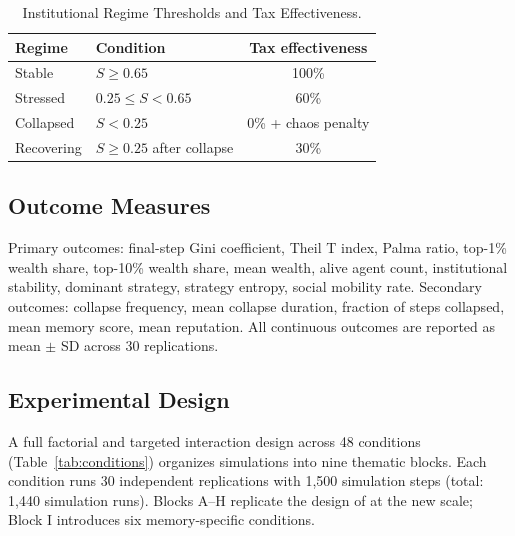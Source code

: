 \documentclass[12pt, letterpaper]{article}
\begin{document}
\begin{table}[h]
\centering
\caption{Institutional Regime Thresholds and Tax Effectiveness.}
\label{tab:regimes}
\begin{tabular}{llc}
\toprule
Regime & Condition & Tax effectiveness \\
\midrule
Stable      & $S \geq 0.65$                   & 100\% \\
Stressed    & $0.25 \leq S < 0.65$            & 60\% \\
Collapsed   & $S < 0.25$                      & 0\% + chaos penalty \\
Recovering  & $S \geq 0.25$ after collapse    & 30\% \\
\bottomrule
\end{tabular}
\end{table}

\subsection{Outcome Measures}

Primary outcomes: final-step Gini coefficient, Theil T index, Palma
ratio, top-1\% wealth share, top-10\% wealth share, mean wealth, alive
agent count, institutional stability, dominant strategy, strategy entropy,
social mobility rate. Secondary outcomes: collapse frequency, mean
collapse duration, fraction of steps collapsed, mean memory score, mean
reputation. All continuous outcomes are reported as mean $\pm$ SD across
30 replications.

\subsection{Experimental Design}

A full factorial and targeted interaction design across 48 conditions
(Table~\ref{tab:conditions}) organizes simulations into nine thematic
blocks. Each condition runs 30 independent replications with 1,500
simulation steps (total: 1,440 simulation runs). Blocks A--H replicate
the design of \citet{delaserna2025v2} at the new scale; Block I
introduces six memory-specific conditions.
\end{document}
